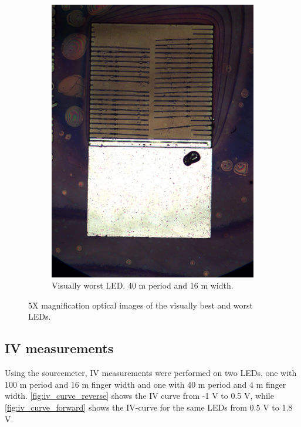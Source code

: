 \begin{figure}
\begin{subfigure}{0.49\linewidth}
        \includegraphics[width=\textwidth]{figures/led_40_16_5x.jpg}
        \caption{Visually worst LED. 40 \textmu m period and 16 \textmu m width.}
        \label{fig:worst_led}
    \end{subfigure}
    \caption{5X magnification optical images of the visually best and worst LEDs.}
\end{figure}




\subsection{IV measurements}

\noindent Using the sourcemeter, IV measurements were performed on two LEDs, one with 100 \textmu m period and 16 \textmu m finger width and one with 40 \textmu m period and 4 \textmu m finger width.
\autoref{fig:iv_curve_reverse} shows the IV curve from -1 V to 0.5 V, while \autoref{fig:iv_curve_forward} shows the IV-curve for the same LEDs from 0.5 V to 1.8 V.

